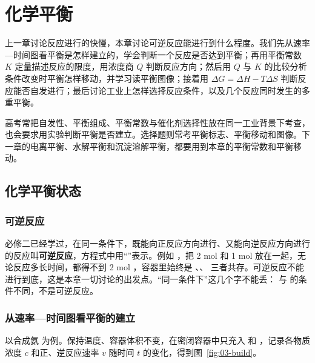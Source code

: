 \newcommand{\cthreevtaxes}{\draw[c3ax] (0,0)--(4.2,0) node[below]{$t$}; \draw[c3ax] (0,0)--(0,3.2) node[left]{$v$}; \draw[c3cv] (0,1.3)--(1.2,1.3);}

\chapter{化学平衡}

上一章讨论反应进行的快慢，本章讨论可逆反应能进行到什么程度。我们先从速率—时间图看平衡是怎样建立的，学会判断一个反应是否达到平衡；再用平衡常数 $K$ 定量描述反应的限度，用浓度商 $Q$ 判断反应方向；然后用 $Q$ 与 $K$ 的比较分析条件改变时平衡怎样移动，并学习读平衡图像；接着用 $\Delta G=\Delta H-T\Delta S$ 判断反应能否自发进行；最后讨论工业上怎样选择反应条件，以及几个反应同时发生的多重平衡。

高考常把自发性、平衡组成、平衡常数与催化剂选择性放在同一工业背景下考查，也会要求用实验判断平衡是否建立。选择题则常考平衡标志、平衡移动和图像。下一章的电离平衡、水解平衡和沉淀溶解平衡，都要用到本章的平衡常数和平衡移动。

\section{化学平衡状态}

\subsection{可逆反应}
必修二已经学过，在同一条件下，既能向正反应方向进行、又能向逆反应方向进行的反应叫\textbf{可逆反应}，方程式中用“\ce{<=>}”表示。例如 ，把 2 mol  和 1 mol  放在一起，无论反应多长时间，都得不到 2 mol ，容器里始终是 、、 三者共存。可逆反应不能进行到底，这是本章一切讨论的出发点。“同一条件下”这几个字不能丢： 与  的条件不同，不是可逆反应。

\subsection{从速率—时间图看平衡的建立}
以合成氨  为例。保持温度、容器体积不变，在密闭容器中只充入  和 ，记录各物质浓度 $c$ 和正、逆反应速率 $v$ 随时间 $t$ 的变化，得到图~\ref{fig:03-build}。

